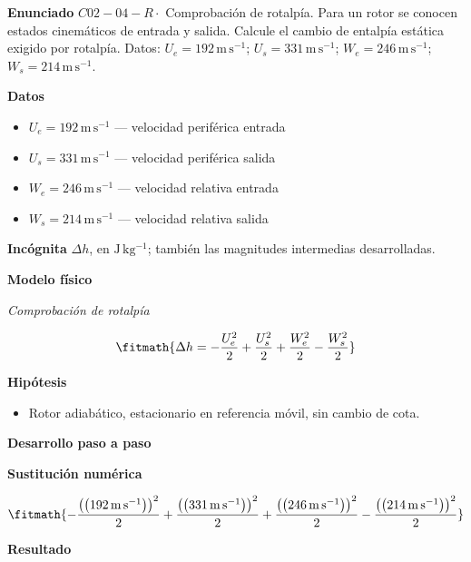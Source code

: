 \documentclass[10pt,openany]{book}
\begin{document}
\begin{tcolorbox}[title={Problema resuelto 4}, studiumworked, breakable]

\noindent\textbf{Enunciado}
\(C02-04-R \cdot\) Comprobación de rotalpía. Para un rotor se conocen estados cinemáticos de entrada y salida. Calcule el cambio de entalpía estática exigido por rotalpía. Datos: \(U_e=192\, \mathrm{m}\,\mathrm{s}^{-1}\); \(U_s=331\, \mathrm{m}\,\mathrm{s}^{-1}\); \(W_e=246\, \mathrm{m}\,\mathrm{s}^{-1}\); \(W_s=214\, \mathrm{m}\,\mathrm{s}^{-1}\).

\noindent\textbf{Datos}
\begin{itemize}
\item $U_e = 192\,\mathrm{m}\,\mathrm{s}^{-1}$ — velocidad periférica entrada
\item $U_s = 331\,\mathrm{m}\,\mathrm{s}^{-1}$ — velocidad periférica salida
\item $W_e = 246\,\mathrm{m}\,\mathrm{s}^{-1}$ — velocidad relativa entrada
\item $W_s = 214\,\mathrm{m}\,\mathrm{s}^{-1}$ — velocidad relativa salida
\end{itemize}

\noindent\textbf{Incógnita}
$\Delta h$, en $\mathrm{J\,kg^{-1}}$; también las magnitudes intermedias desarrolladas.

\noindent\textbf{Modelo físico}

\noindent\textit{Comprobación de rotalpía}

\[
\fitmath{\Delta h=- \frac{U_e^{2}}{2} + \frac{U_s^{2}}{2} + \frac{W_e^{2}}{2} - \frac{W_s^{2}}{2}}
\]

\noindent\textbf{Hipótesis}
\begin{itemize}
\item Rotor adiabático, estacionario en referencia móvil, sin cambio de cota.
\end{itemize}

\noindent\textbf{Desarrollo paso a paso}



\noindent\textbf{Sustitución numérica}

\[
\fitmath{- \frac{\left(\left(192\,\mathrm{m}\,\mathrm{s}^{-1}\right)\right)^{2}}{2} + \frac{\left(\left(331\,\mathrm{m}\,\mathrm{s}^{-1}\right)\right)^{2}}{2} + \frac{\left(\left(246\,\mathrm{m}\,\mathrm{s}^{-1}\right)\right)^{2}}{2} - \frac{\left(\left(214\,\mathrm{m}\,\mathrm{s}^{-1}\right)\right)^{2}}{2}}
\]

\noindent\textbf{Resultado}


\end{tcolorbox}
\end{document}
